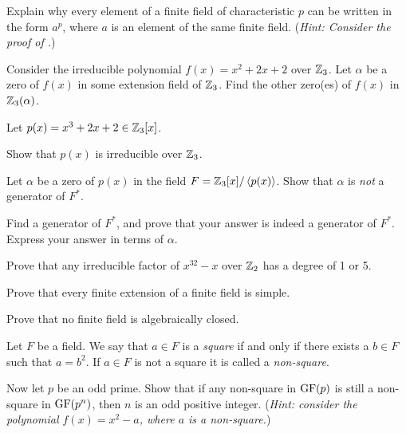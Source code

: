\begin{problem}
    Explain why every element of a finite field of characteristic $p$ can be written in the form $a^p$, where $a$ is an element of the same finite field.\newline
    (\textit{Hint: Consider the proof of .})
\end{problem}

\begin{problem}
    Consider the irreducible polynomial $f(x) = x^2 + 2x + 2$ over $\mathbb{Z}_3$. Let $\alpha$ be a zero of $f(x)$ in some extension field of $\mathbb{Z}_3$. Find the other zero(es) of $f(x)$ in $\mathbb{Z}_3(\alpha)$.
\end{problem}

\begin{problem}\label{problem-zero-of-irreducible-in-finite-field-is-not-generator}
    Let $p(x) = x^3 + 2x + 2 \in \mathbb{Z}_3[x]$.
    \begin{partquestions}{\roman*}
        \item Show that $p(x)$ is irreducible over $\mathbb{Z}_3$.
        \item Let $\alpha$ be a zero of $p(x)$ in the field $F = \mathbb{Z}_3[x]/\left\langle p(x)\right\rangle$. Show that $\alpha$ is \textit{not} a generator of $F^\ast$.
        \item Find a generator of $F^\ast$, and prove that your answer is indeed a generator of $F^\ast$. Express your answer in terms of $\alpha$.
    \end{partquestions}
\end{problem}

\begin{problem}
    Prove that any irreducible factor of $x^{32} - x$ over $\mathbb{Z}_2$ has a degree of 1 or 5.
\end{problem}

\begin{problem}
    Prove that every finite extension of a finite field is simple.
\end{problem}

\begin{problem}
    Prove that no finite field is algebraically closed.
\end{problem}

\begin{problem}
    Let $F$ be a field. We say that $a \in F$ is a \textit{square} if and only if there exists a $b \in F$ such that $a = b^2$. If $a \in F$ is not a square it is called a \textit{non-square}.

    Now let $p$ be an odd prime. Show that if any non-square in $\mathrm{GF}(p)$ is still a non-square in $\mathrm{GF}(p^n)$, then $n$ is an odd positive integer.\newline
    (\textit{Hint: consider the polynomial $f(x) = x^2-a$, where $a$ is a non-square.})
\end{problem}
